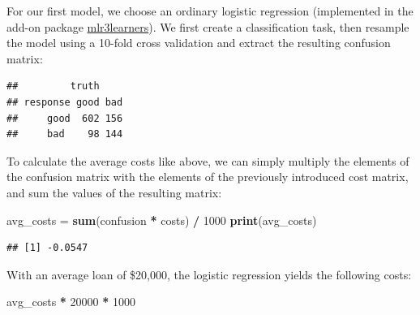 \documentclass[]{scrbook}
\newenvironment{Shaded}{\begin{snugshade}}{\end{snugshade}}
\newcommand{\DecValTok}[1]{\textcolor[rgb]{0.00,0.00,0.81}{#1}}
\newcommand{\KeywordTok}[1]{\textcolor[rgb]{0.13,0.29,0.53}{\textbf{#1}}}
\newcommand{\NormalTok}[1]{#1}
\newcommand{\OperatorTok}[1]{\textcolor[rgb]{0.81,0.36,0.00}{\textbf{#1}}}
\newcommand{\StringTok}[1]{\textcolor[rgb]{0.31,0.60,0.02}{#1}}
\renewenvironment{Shaded} {\begin{snugshade}\small} {\end{snugshade}}
\begin{document}
For our first model, we choose an ordinary logistic regression (implemented in the add-on package \href{https://mlr3learners.mlr-org.com}{mlr3learners}).
We first create a classification task, then resample the model using a 10-fold cross validation and extract the resulting confusion matrix:

\begin{Shaded}
\end{Shaded}

\begin{verbatim}
##         truth
## response good bad
##     good  602 156
##     bad    98 144
\end{verbatim}

To calculate the average costs like above, we can simply multiply the elements of the confusion matrix with the elements of the previously introduced cost matrix, and sum the values of the resulting matrix:

\begin{Shaded}
\begin{Highlighting}[]
\NormalTok{avg_costs =}\StringTok{ }\KeywordTok{sum}\NormalTok{(confusion }\OperatorTok{*}\StringTok{ }\NormalTok{costs) }\OperatorTok{/}\StringTok{ }\DecValTok{1000}
\KeywordTok{print}\NormalTok{(avg_costs)}
\end{Highlighting}
\end{Shaded}

\begin{verbatim}
## [1] -0.0547
\end{verbatim}

With an average loan of \$20,000, the logistic regression yields the following costs:

\begin{Shaded}
\begin{Highlighting}[]
\NormalTok{avg_costs }\OperatorTok{*}\StringTok{ }\DecValTok{20000} \OperatorTok{*}\StringTok{ }\DecValTok{1000}
\end{Highlighting}
\end{Shaded}
\end{document}
